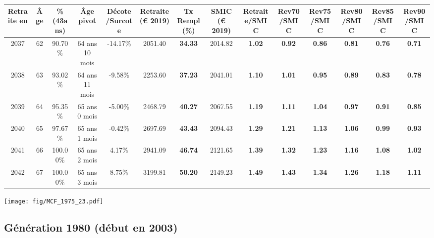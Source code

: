 \begin{adjustbox}{max width=\textwidth} 
\begin{tabular}[htb]{|c|c||c|c|c||c|c||c||c|c|c|c|c|c|} 
\hline 
 Retraite en &  Âge &  \%(43ans) &  Âge pivot &  Décote/Surcote &  Retraite (\euro{} 2019) &  Tx Rempl(\%) &  SMIC (\euro{} 2019) &  Retraite/SMIC &  Rev70/SMIC &  Rev75/SMIC &  Rev80/SMIC &  Rev85/SMIC &  Rev90/SMIC \\ 
\hline \hline 
 2037 &  62 &  90.70\% &  64 ans 10 mois &  -14.17\% &  2051.40 &  {\bf 34.33} &  2014.82 &  {\bf 1.02} &  {\bf {\color{red} 0.92}} &  {\bf {\color{red} 0.86}} &  {\bf {\color{red} 0.81}} &  {\bf {\color{red} 0.76}} &  {\bf {\color{red} 0.71}} \\ 
\hline 
 2038 &  63 &  93.02\% &  64 ans 11 mois &  -9.58\% &  2253.60 &  {\bf 37.23} &  2041.01 &  {\bf 1.10} &  {\bf 1.01} &  {\bf {\color{red} 0.95}} &  {\bf {\color{red} 0.89}} &  {\bf {\color{red} 0.83}} &  {\bf {\color{red} 0.78}} \\ 
\hline 
 2039 &  64 &  95.35\% &  65 ans 0 mois &  -5.00\% &  2468.79 &  {\bf 40.27} &  2067.55 &  {\bf 1.19} &  {\bf 1.11} &  {\bf 1.04} &  {\bf {\color{red} 0.97}} &  {\bf {\color{red} 0.91}} &  {\bf {\color{red} 0.85}} \\ 
\hline 
 2040 &  65 &  97.67\% &  65 ans 1 mois &  -0.42\% &  2697.69 &  {\bf 43.43} &  2094.43 &  {\bf 1.29} &  {\bf 1.21} &  {\bf 1.13} &  {\bf 1.06} &  {\bf {\color{red} 0.99}} &  {\bf {\color{red} 0.93}} \\ 
\hline 
 2041 &  66 &  100.00\% &  65 ans 2 mois &  4.17\% &  2941.09 &  {\bf 46.74} &  2121.65 &  {\bf 1.39} &  {\bf 1.32} &  {\bf 1.23} &  {\bf 1.16} &  {\bf 1.08} &  {\bf 1.02} \\ 
\hline 
 2042 &  67 &  100.00\% &  65 ans 3 mois &  8.75\% &  3199.81 &  {\bf 50.20} &  2149.23 &  {\bf 1.49} &  {\bf 1.43} &  {\bf 1.34} &  {\bf 1.26} &  {\bf 1.18} &  {\bf 1.11} \\ 
\hline 
\hline 
\end{tabular} 
\end{adjustbox} 
 
 \vspace{0.1cm} 

 \begin{center}\texttt{[image: fig/MCF\_1975\_23.pdf]}\end{center} \label{fig/MCF_1975_23.pdf} 

\newpage 
 
\subsection{Génération 1980 (début en 2003)} 

